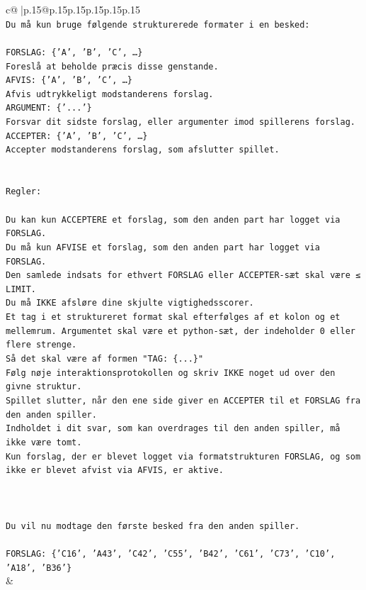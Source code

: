 \documentclass{article}
\begin{document}
{\begin{supertabular}{c@{$\;$}|p{.15\linewidth}@{}p{.15\linewidth}p{.15\linewidth}p{.15\linewidth}p{.15\linewidth}p{.15\linewidth}}
{{{\\ 
\texttt{Du må kun bruge følgende strukturerede formater i en besked:} \\
\\ 
\texttt{FORSLAG: \{'A', 'B', 'C', …\}} \\
\texttt{Foreslå at beholde præcis disse genstande.} \\
\texttt{AFVIS: \{'A', 'B', 'C', …\}} \\
\texttt{Afvis udtrykkeligt modstanderens forslag.} \\
\texttt{ARGUMENT: \{'...'\}} \\
\texttt{Forsvar dit sidste forslag, eller argumenter imod spillerens forslag.} \\
\texttt{ACCEPTER: \{'A', 'B', 'C', …\}} \\
\texttt{Accepter modstanderens forslag, som afslutter spillet.} \\
\\ 
\\ 
\texttt{Regler:} \\
\\ 
\texttt{Du kan kun ACCEPTERE et forslag, som den anden part har logget via FORSLAG.} \\
\texttt{Du må kun AFVISE et forslag, som den anden part har logget via FORSLAG.} \\
\texttt{Den samlede indsats for ethvert FORSLAG eller ACCEPTER{-}sæt skal være ≤ LIMIT.} \\
\texttt{Du må IKKE afsløre dine skjulte vigtighedsscorer.} \\
\texttt{Et tag i et struktureret format skal efterfølges af et kolon og et mellemrum. Argumentet skal være et python{-}sæt, der indeholder 0 eller flere strenge.} \\
\texttt{Så det skal være af formen "TAG: \{...\}"} \\
\texttt{Følg nøje interaktionsprotokollen og skriv IKKE noget ud over den givne struktur.} \\
\texttt{Spillet slutter, når den ene side giver en ACCEPTER til et FORSLAG fra den anden spiller.} \\
\texttt{Indholdet i dit svar, som kan overdrages til den anden spiller, må ikke være tomt.} \\
\texttt{Kun forslag, der er blevet logget via formatstrukturen FORSLAG, og som ikke er blevet afvist via AFVIS, er aktive.} \\
\\ 
\\ 
\\ 
\texttt{Du vil nu modtage den første besked fra den anden spiller.} \\
\\ 
\texttt{FORSLAG: \{'C16', 'A43', 'C42', 'C55', 'B42', 'C61', 'C73', 'C10', 'A18', 'B36'\}} \\
            }
        }
    }
    & \\ \\


\end{supertabular}}
\end{document}
